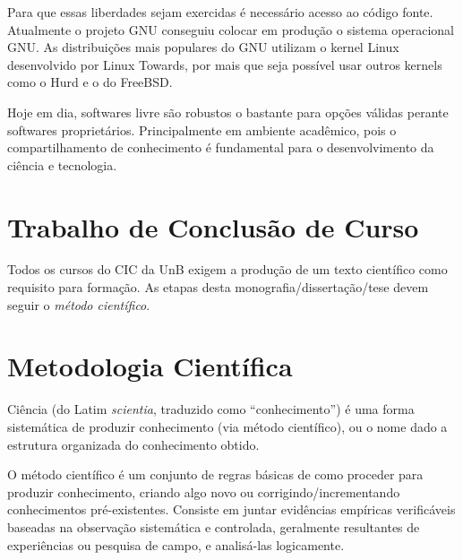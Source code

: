 Para que essas liberdades sejam exercidas é necessário acesso ao código fonte. Atualmente o projeto GNU conseguiu colocar em produção o sistema operacional GNU. As distribuições mais populares do GNU utilizam o kernel Linux desenvolvido por Linux Towards, por mais que seja possível usar outros kernels como o Hurd\cite{Hurd} e o do FreeBSD\cite{Debian_kFreeBSD}.

Hoje em dia, softwares livre são robustos o bastante para opções válidas perante softwares proprietários. Principalmente em ambiente acadêmico, pois o compartilhamento de conhecimento é fundamental para o desenvolvimento da ciência e tecnologia.




\iffalse


\section{Trabalho de Conclusão de Curso}%
Todos os cursos do \acrfull{CIC} da \acrfull{UnB} exigem a produção de um
texto científico como requisito para formação. %
As etapas desta monografia/dissertação/tese devem seguir o \emph{método científico}.

\section{Metodologia Científica}%
Ciência (do Latim \emph{scientia}, traduzido como ``conhecimento'') é uma forma
sistemática de produzir conhecimento (via método científico), ou o nome dado a
estrutura organizada do conhecimento obtido.

O método científico é um conjunto de regras básicas de como proceder para produzir
conhecimento, criando algo novo ou corrigindo/incrementando conhecimentos
pré-existentes. Consiste em juntar evidências empíricas verificáveis baseadas na
observação sistemática e controlada, geralmente resultantes de experiências ou
pesquisa de campo, e analisá-las logicamente.

